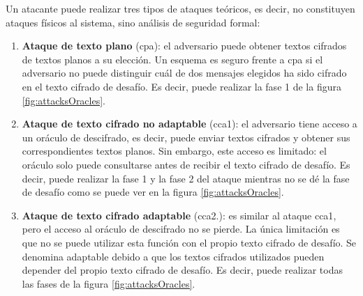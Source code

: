 Un atacante puede realizar tres tipos de ataques teóricos, es decir, no constituyen ataques físicos al sistema, sino análisis de seguridad formal:
\begin{enumerate}
	\item \textbf{Ataque de texto plano} (\acrshort{cpa}): el adversario puede obtener textos cifrados de textos planos a su elección. Un esquema es seguro frente a \acrshort{cpa} si el adversario no puede distinguir cuál de dos mensajes elegidos ha sido cifrado en el texto cifrado de desafío. Es decir, puede realizar la fase 1 de la figura \ref{fig:attacksOracles}.
	\item \textbf{Ataque de texto cifrado no adaptable} (\acrshort{cca1}): el adversario tiene acceso a un oráculo de descifrado, es decir, puede enviar textos cifrados y obtener sus correspondientes textos planos. Sin embargo, este acceso es limitado: el oráculo solo puede consultarse antes de recibir el texto cifrado de desafío. Es decir, puede realizar la fase 1 y la fase 2 del ataque mientras no se dé la fase de desafío como se puede ver en la figura \ref{fig:attacksOracles}.
	\item \textbf{Ataque de texto cifrado adaptable} (\acrshort{cca2.}): es similar al ataque \acrshort{cca1}, pero el acceso al oráculo de descifrado no se pierde. La única limitación es que no se puede utilizar esta función con el propio texto cifrado de desafío. Se denomina adaptable debido a que los textos cifrados utilizados pueden depender del propio texto cifrado de desafío. Es decir, puede realizar todas las fases de la figura \ref{fig:attacksOracles}.
\end{enumerate}
\newline


